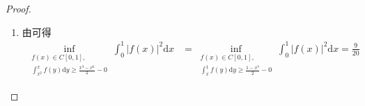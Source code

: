 \documentclass[../../main.tex]{subfiles}
\begin{document}
\begin{proof}
\begin{enumerate}
\item 由可得
\begin{align*}
\inf_{\substack{f(x) \in C[0,1], \\ \int_{x^2}^x f(y) \mathrm{d}y \geqslant \frac{x^3 - x^6}{2} - 0}} \int_0^1 |f(x)|^2 \mathrm{d}x &= \inf_{\substack{f(x) \in C[0,1], \\ \int_x^1 f(y) \mathrm{d}y \geqslant \frac{1 - x^3}{2} - 0}} \int_0^1 |f(x)|^2 \mathrm{d}x = \frac{9}{20}
\end{align*}
\end{enumerate}

\end{proof}
\end{document}
